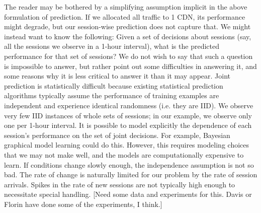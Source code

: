 The reader may be bothered by a simplifying assumption implicit in the above formulation of prediction.  If we allocated all traffic to 1 CDN, its performance might degrade, but our session-wise prediction does not capture that.  We might instead want to know the following: Given a set of decisions about sessions (say, all the sessions we observe in a 1-hour interval), what is the predicted performance for that set of sessions?  We do not wish to say that such a question is impossible to answer, but rather point out some difficulties in answering it, and some reasons why it is less critical to answer it than it may appear.
Joint prediction is statistically difficult because existing statistical prediction algorithms typically assume the performance of training examples are independent and experience identical randomness (i.e. they are IID).  We observe very few IID instances of whole sets of sessions; in our example, we observe only one per 1-hour interval.  It is possible to model explicitly the dependence of each session’s performance on the set of joint decisions.  For example, Bayesian graphical model learning could do this.  However, this requires modeling choices that we may not make well, and the models are computationally expensive to learn.
If conditions change slowly enough, the independence assumption is not so bad.
The rate of change is naturally limited for our problem by the rate of session arrivals.  Spikes in the rate of new sessions are not typically high enough to necessitate special handling.  [Need some data and experiments for this.  Davis or Florin have done some of the experiments, I think.]

